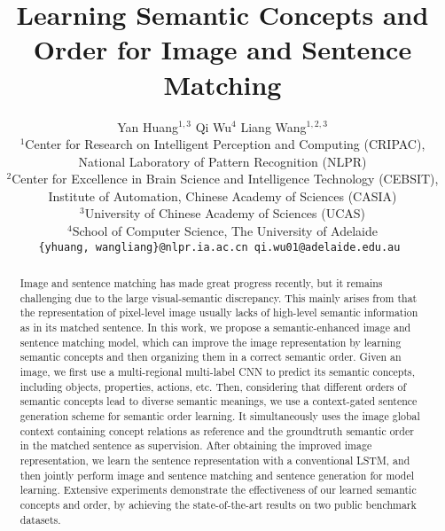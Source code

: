 \documentclass[10pt,twocolumn,letterpaper]{article}
\begin{document}
\title{Learning Semantic Concepts and Order for Image and Sentence Matching } 

\author{Yan Huang$^{1,3}$ \hspace{7mm} Qi Wu$^{4}$  \hspace{7mm} Liang Wang$^{1,2,3}$\\
$^1$Center for Research on Intelligent Perception and Computing (CRIPAC),\\
National Laboratory of Pattern Recognition (NLPR)\\
$^2$Center for Excellence in Brain Science and Intelligence Technology (CEBSIT),\\
Institute of Automation, Chinese Academy of Sciences (CASIA)\\
$^3$University of Chinese Academy of Sciences (UCAS)\\
$^4$School of Computer Science, The University of Adelaide\\
{\tt\small \{yhuang, wangliang\}@nlpr.ia.ac.cn \hspace{3mm} qi.wu01@adelaide.edu.au }
}


\maketitle


\begin{abstract}
   Image and sentence matching has made great progress recently, but it
   remains challenging due to the large visual-semantic discrepancy.
   This mainly arises from that the representation of pixel-level image usually lacks of
   high-level semantic information as in its matched sentence.
   In this work, we propose a semantic-enhanced image and sentence matching model,
   which can improve the image representation
   by learning semantic concepts and then organizing them in a correct semantic order.
   Given an image, we first use a multi-regional multi-label CNN
   to predict its semantic concepts, including objects, properties, actions, etc.
Then, considering that different orders of semantic concepts lead to
   diverse semantic meanings,
   we use a context-gated sentence generation scheme for semantic order learning.
   It simultaneously uses the image global context containing concept relations as reference
   and the groundtruth semantic order in the matched sentence as supervision.
   After obtaining the improved image representation, we learn the sentence representation
   with a conventional LSTM, and then jointly perform image and sentence matching
   and sentence generation for model learning.
   Extensive experiments demonstrate the effectiveness of
   our learned semantic concepts and order,
   by achieving the state-of-the-art results on two public benchmark datasets.


\end{abstract}
\end{document}
